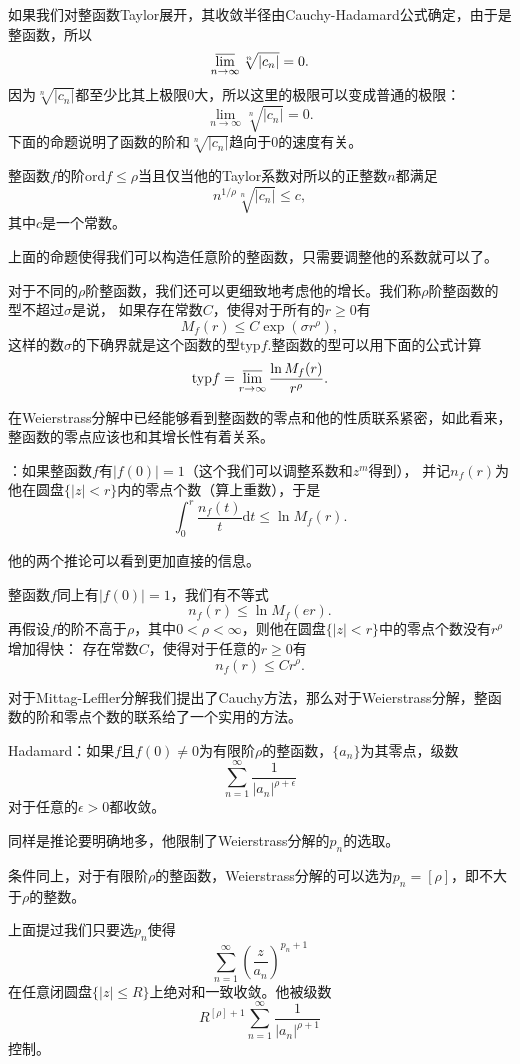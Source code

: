 如果我们对整函数Taylor展开，其收敛半径由Cauchy-Hadamard公式确定，由于是整函数，所以
\[
    \varlimsup_{n\to \infty} \sqrt[n]{|c_n|}=0.
\]
因为$\sqrt[n]{|c_n|}$都至少比其上极限0大，所以这里的极限可以变成普通的极限：
\[
    \lim_{n\to \infty} \sqrt[n]{|c_n|}=0.
\]
下面的命题说明了函数的阶和$ \sqrt[n]{|c_n|}$趋向于0的速度有关。
\begin{pro}
整函数$f$的阶$\mathrm{ord} f \leq \rho$当且仅当他的Taylor系数对所以的正整数$n$都满足
\[
n^{1/\rho}\sqrt[n]{|c_n|}\leq c,
\]
其中$c$是一个常数。
\end{pro}
上面的命题使得我们可以构造任意阶的整函数，只需要调整他的系数就可以了。

对于不同的$\rho$阶整函数，我们还可以更细致地考虑他的增长。我们称$\rho$阶整函数的型不超过$\sigma$是说，
如果存在常数$C$，使得对于所有的$r\geq 0$有
\[
M_f(r)\leq C \exp(\sigma r^\rho ),
\]
这样的数$\sigma$的下确界就是这个函数的型$\mathrm{typ} f$.整函数的型可以用下面的公式计算
\[
\mathrm{typ} f =\varlimsup_{r\to \infty} \frac{\ln M_f(r)}{r^\rho}.
\]

在Weierstrass分解中已经能够看到整函数的零点和他的性质联系紧密，如此看来，整函数的零点应该也和其增长性有着关系。
\begin{pro}[Jensen不等式]
：如果整函数$f$有$|f(0)|=1$（这个我们可以调整系数和$z^m$得到），
并记$n_f(r)$为他在圆盘$\{|z|<r\}$内的零点个数（算上重数），于是
\[
\int_{0}^r \frac{n_f(t)}{t}\mathrm{d}t \leq \ln M_f(r).
\]
\end{pro}
他的两个推论可以看到更加直接的信息。
\begin{pro}
整函数$f$同上有$|f(0)|=1$，我们有不等式
\[
n_f(r)\leq \ln M_f(er).
\]
再假设$f$的阶不高于$\rho$，其中$0<\rho<\infty$，则他在圆盘$\{|z|<r\}$中的零点个数没有$r^\rho$增加得快：
存在常数$C$，使得对于任意的$r\geq 0$有
\[
n_f(r)\leq Cr^\rho.
\]
\end{pro}
对于Mittag-Leffler分解我们提出了Cauchy方法，那么对于Weierstrass分解，整函数的阶和零点个数的联系给了一个实用的方法。

\begin{pro}
Hadamard：如果$f$且$f(0)\neq 0$为有限阶$\rho$的整函数，$\{a_n\}$为其零点，级数
\[
\sum_{n=1}^\infty \frac{1}{|a_n|^{\rho+\epsilon}}
\]
对于任意的$\epsilon>0$都收敛。
\end{pro}
同样是推论要明确地多，他限制了Weierstrass分解的$p_n$的选取。
\begin{pro}
条件同上，对于有限阶$\rho$的整函数，Weierstrass分解的可以选为$p_n=[\rho]$，即不大于$\rho$的整数。
\end{pro}
上面提过我们只要选$p_n$使得
\[
\sum_{n=1}^\infty\left(\frac{z}{a_n}\right)^{p_n+1}
\]
在任意闭圆盘$\{|z|\leq R\}$上绝对和一致收敛。他被级数
\[
R^{[\rho]+1}\sum_{n=1}^\infty \frac{1}{|a_n|^{\rho+1}}
\]
控制。


